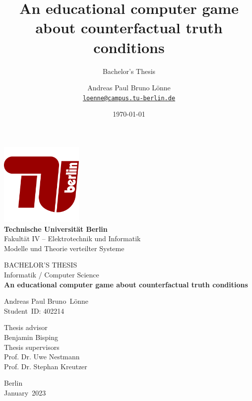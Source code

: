 \documentclass[a4paper,american,10pt]{paper}
\date{\today}
\newcommand{\dctitle}{An educational computer game about counterfactual truth conditions}
\newcommand{\authorlastname}{Lönne}
\newcommand{\authorfirstname}{Andreas Paul Bruno}
\newcommand{\place}{Berlin}
\newcommand{\uni}{Technische Universität \place}
\newcommand{\depart}{Fakultät IV -- Elektrotechnik und Informatik}
\providecommand*{\code}[1]{\texttt{#1}}
\theoremstyle{definition}\newtheorem{lemma}[thm]{Lemma}
\theoremstyle{definition}\newtheorem{proposition}[thm]{Proposition}
\theoremstyle{definition}\newtheorem{corollary}[thm]{Corollary}
\theoremstyle{definition}\newtheorem{definition}{Definition}
\begin{document}
\title{\dctitle}

\subtitle{Bachelor's Thesis}

\author{%
	Andreas Paul Bruno Lönne\\
	\code{\href{mailto:loenne@campus.tu-berlin.de}{loenne@campus.tu-berlin.de}}
}


\begin{titlepage}
 \begin{center}
  \includegraphics[width=4cm]{TU-Berlin-01}\\
  \large
  \textbf{\uni}\\
  \depart\\
  Modelle und Theorie verteilter Systeme\\
  \vspace{2.5cm}
  
  \Large BACHELOR'S THESIS\\
  \small Informatik / Computer Science\\
  \vspace{0.5cm}
  \LARGE \textbf{\dctitle}\\
  \vspace{0.6cm}
  
  \large \authorfirstname~\authorlastname\\
  Student~ID: 402214\\
  \vspace*{\fill}
  
  \small Thesis advisor\\
  \large Benjamin Bisping\\
  \vspace{0.5cm}
  \small Thesis supervisors\\
  \large Prof. Dr. Uwe Nestmann\\
  Prof. Dr. Stephan Kreutzer\\
  \vspace{1.5cm}

  \normalsize  
  \place\\
  January~2023
  

 \end{center}	
\end{titlepage}
\end{document}

